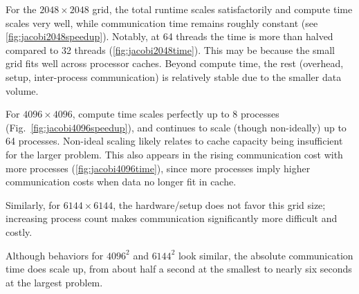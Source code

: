\documentclass{article}
\begin{document}
For the $2048 \times 2048$ grid, the total runtime scales satisfactorily and compute time scales very well, while communication time remains roughly constant (see \ref{fig:jacobi2048speedup}). Notably, at 64 threads the time is more than halved compared to 32 threads (\ref{fig:jacobi2048time}). This may be because the small grid fits well across processor caches. Beyond compute time, the rest (overhead, setup, inter-process communication) is relatively stable due to the smaller data volume.

For $4096 \times 4096$, compute time scales perfectly up to 8 processes (Fig.~\ref{fig:jacobi4096speedup}), and continues to scale (though non-ideally) up to 64 processes. Non-ideal scaling likely relates to cache capacity being insufficient for the larger problem. This also appears in the rising communication cost with more processes (\ref{fig:jacobi4096time}), since more processes imply higher communication costs when data no longer fit in cache.

Similarly, for $6144 \times 6144$, the hardware/setup does not favor this grid size; increasing process count makes communication significantly more difficult and costly.

Although behaviors for $4096^2$ and $6144^2$ look similar, the absolute communication time does scale up, from about half a second at the smallest to nearly six seconds at the largest problem.
\end{document}

